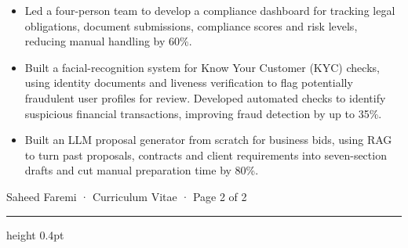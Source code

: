\documentclass[11pt]{article}
\begin{document}
\begin{itemize}
  \item Led a four-person team to develop a compliance dashboard for tracking legal obligations, document submissions, compliance scores and risk levels, reducing manual handling by 60\%.
  \item Built a facial-recognition system for Know Your Customer (KYC) checks, using identity documents and liveness verification to flag potentially fraudulent user profiles for review. Developed automated checks to identify suspicious financial transactions, improving fraud detection by up to 35\%.
  \item Built an LLM proposal generator from scratch for business bids, using RAG to turn past proposals, contracts and client requirements into seven-section drafts and cut manual preparation time by 80\%.
\end{itemize}

\newpage
{\small Saheed Faremi · Curriculum Vitae · Page 2 of 2\par}
\vspace{3pt}\hrule height 0.4pt
\end{document}
